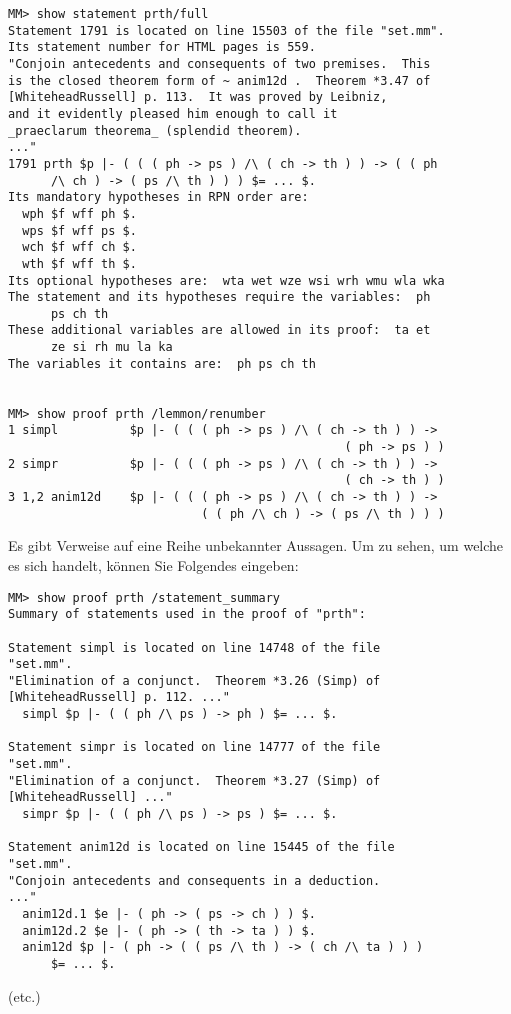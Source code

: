 \begin{verbatim}
MM> show statement prth/full
Statement 1791 is located on line 15503 of the file "set.mm".
Its statement number for HTML pages is 559.
"Conjoin antecedents and consequents of two premises.  This
is the closed theorem form of ~ anim12d .  Theorem *3.47 of
[WhiteheadRussell] p. 113.  It was proved by Leibniz,
and it evidently pleased him enough to call it
_praeclarum theorema_ (splendid theorem).
..."
1791 prth $p |- ( ( ( ph -> ps ) /\ ( ch -> th ) ) -> ( ( ph
      /\ ch ) -> ( ps /\ th ) ) ) $= ... $.
Its mandatory hypotheses in RPN order are:
  wph $f wff ph $.
  wps $f wff ps $.
  wch $f wff ch $.
  wth $f wff th $.
Its optional hypotheses are:  wta wet wze wsi wrh wmu wla wka
The statement and its hypotheses require the variables:  ph
      ps ch th
These additional variables are allowed in its proof:  ta et
      ze si rh mu la ka
The variables it contains are:  ph ps ch th


MM> show proof prth /lemmon/renumber
1 simpl          $p |- ( ( ( ph -> ps ) /\ ( ch -> th ) ) ->
                                               ( ph -> ps ) )
2 simpr          $p |- ( ( ( ph -> ps ) /\ ( ch -> th ) ) ->
                                               ( ch -> th ) )
3 1,2 anim12d    $p |- ( ( ( ph -> ps ) /\ ( ch -> th ) ) ->
                           ( ( ph /\ ch ) -> ( ps /\ th ) ) )
\end{verbatim}

Es gibt Verweise auf eine Reihe unbekannter Aussagen.  Um zu sehen, um welche es sich handelt, können Sie Folgendes eingeben:

\begin{verbatim}
MM> show proof prth /statement_summary
Summary of statements used in the proof of "prth":

Statement simpl is located on line 14748 of the file
"set.mm".
"Elimination of a conjunct.  Theorem *3.26 (Simp) of
[WhiteheadRussell] p. 112. ..."
  simpl $p |- ( ( ph /\ ps ) -> ph ) $= ... $.

Statement simpr is located on line 14777 of the file
"set.mm".
"Elimination of a conjunct.  Theorem *3.27 (Simp) of
[WhiteheadRussell] ..."
  simpr $p |- ( ( ph /\ ps ) -> ps ) $= ... $.

Statement anim12d is located on line 15445 of the file
"set.mm".
"Conjoin antecedents and consequents in a deduction.
..."
  anim12d.1 $e |- ( ph -> ( ps -> ch ) ) $.
  anim12d.2 $e |- ( ph -> ( th -> ta ) ) $.
  anim12d $p |- ( ph -> ( ( ps /\ th ) -> ( ch /\ ta ) ) )
      $= ... $.
\end{verbatim}
\begin{center}
(etc.)
\end{center}

